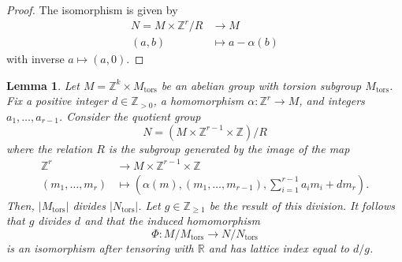 \documentclass{article}
\def\Z{\mathbb{Z}}
\newtheorem{lemma}[definition]{Lemma}
\begin{document}
\begin{proof}
    The isomorphism is given by 
    \begin{align*}
        N = M \times \mathbb{Z}^r/R & \rightarrow M \\
        (a, b) &\mapsto a - \alpha(b)
    \end{align*}
    with inverse $a \mapsto (a,0)$.
\end{proof}

\begin{lemma} \label{lem: constrained}
    Let $M = \mathbb{Z}^k \times M_{\mathrm{tors}}$ be an abelian group with torsion subgroup $M_{\mathrm{tors}}$. Fix a positive integer $d \in \mathbb{Z}_{>0}$, a homomorphism $\alpha: \mathbb{Z}^r \to M$, and integers $a_1, \ldots, a_{r-1}$. Consider the quotient group
\begin{equation*}
    N = (M \times \mathbb{Z}^{r-1} \times \mathbb{Z}) / R
\end{equation*}
where the relation $R$ is the subgroup generated by the image of the map
\begin{align*}
    \mathbb{Z}^r & \to M \times \mathbb{Z}^{r-1} \times \mathbb{Z} \\
    (m_1, \ldots, m_r) & \mapsto \left(\alpha(m), (m_1, \ldots, m_{r-1}), \sum_{i=1}^{r-1} a_i m_i + d m_r\right).
\end{align*}
Then,  $|M_{\mathrm{tors}} |$ divides $ |N_{\mathrm{tors}}|$. Let $g \in \Z_{\geq 1}$ be the result of this division. It follows that $g$ divides $d$ and that the induced homomorphism
\begin{equation*}
    \Phi: M/M_{\mathrm{tors}} \to N/N_{\mathrm{tors}}
\end{equation*}
is an isomorphism after tensoring with $\mathbb{R}$ and has lattice index equal to $d/g$.
    
\end{lemma}
\end{document}
